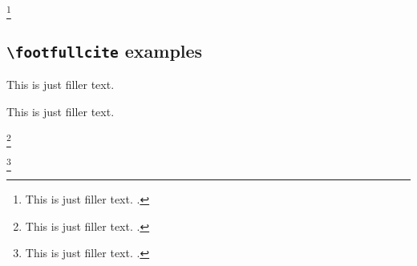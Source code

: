 \documentclass[a4paper]{article}
\newcommand{\cmd}[1]{\texttt{\textbackslash #1}}
\begin{document}
\footnote{This is just filler text. .}

\subsection*{\cmd{footfullcite} examples}

This is just filler text. 

This is just filler text. 

\footnote{This is just filler text. .}

\footnote{This is just filler text. .}

\clearpage

\printshorthands

\nocite{*}
\printbibliography[notkeyword=journalnumberdate]
\end{document}
